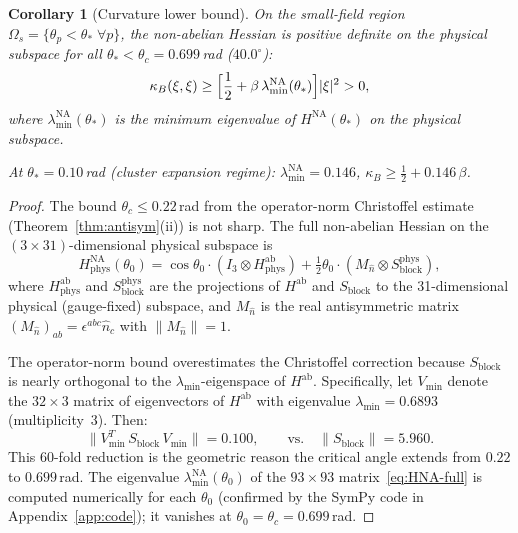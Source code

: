 \documentclass[11pt]{article}
\newtheorem{corollary}[theorem]{Corollary}
\theoremstyle{definition}
\begin{document}
\begin{corollary}[Curvature lower bound]\label{cor:curvature}
On the small-field region $\Omega_s=\{\theta_p<\theta_*\;\forall p\}$,
the non-abelian Hessian is positive definite on the physical
subspace for all $\theta_*<\theta_c=0.699$\,rad ($40.0^\circ$):
\begin{equation}\label{eq:kappa}
\kappa_B(\xi,\xi)
\ge\Bigl[\frac{1}{2}+\beta\,\lambda_{\min}^{\mathrm{NA}}(\theta_*)\Bigr]|\xi|^2
>0,
\end{equation}
where $\lambda_{\min}^{\mathrm{NA}}(\theta_*)$ is the minimum
eigenvalue of $H^{\mathrm{NA}}(\theta_*)$ on the physical subspace.

At $\theta_*=0.10$\,rad (cluster expansion regime):
$\lambda_{\min}^{\mathrm{NA}}=0.146$,
$\kappa_B\ge\frac{1}{2}+0.146\,\beta$.
\end{corollary}

\begin{proof}
The bound $\theta_c\le 0.22$\,rad from the operator-norm
Christoffel estimate (Theorem~\ref{thm:antisym}(ii)) is not sharp.
The full non-abelian Hessian on the $(3\times 31)$-dimensional physical
subspace is
\begin{equation}\label{eq:HNA-full}
H^{\mathrm{NA}}_{\mathrm{phys}}(\theta_0)
=\cos\theta_0\cdot(I_3\otimes H^{\mathrm{ab}}_{\mathrm{phys}})
+\tfrac{1}{2}\theta_0\cdot(M_{\hat{n}}\otimes S^{\mathrm{phys}}_{\mathrm{block}}),
\end{equation}
where $H^{\mathrm{ab}}_{\mathrm{phys}}$ and
$S^{\mathrm{phys}}_{\mathrm{block}}$ are the projections
of $H^{\mathrm{ab}}$ and $S_{\mathrm{block}}$ to the 31-dimensional
physical (gauge-fixed) subspace, and $M_{\hat{n}}$ is the real
antisymmetric matrix $(M_{\hat{n}})_{ab}=\epsilon^{abc}\hat{n}_c$
with $\|M_{\hat{n}}\|=1$.

The operator-norm bound overestimates the Christoffel correction
because $S_{\mathrm{block}}$ is nearly orthogonal to the
$\lambda_{\min}$-eigenspace of $H^{\mathrm{ab}}$.
Specifically, let $V_{\min}$ denote the $32\times 3$ matrix of
eigenvectors of $H^{\mathrm{ab}}$ with eigenvalue
$\lambda_{\min}=0.6893$ (multiplicity~3).  Then:
\begin{equation}\label{eq:S-restricted}
\|V_{\min}^T\,S_{\mathrm{block}}\,V_{\min}\|=0.100,
\qquad\text{vs.}\quad\|S_{\mathrm{block}}\|=5.960.
\end{equation}
This 60-fold reduction is the geometric reason the critical angle
extends from $0.22$ to $0.699$\,rad.  The eigenvalue
$\lambda_{\min}^{\mathrm{NA}}(\theta_0)$ of the $93\times 93$
matrix~\eqref{eq:HNA-full} is computed numerically for each
$\theta_0$ (confirmed by the SymPy code in Appendix~\ref{app:code});
it vanishes at $\theta_0=\theta_c=0.699$\,rad.
\end{proof}
\end{document}
